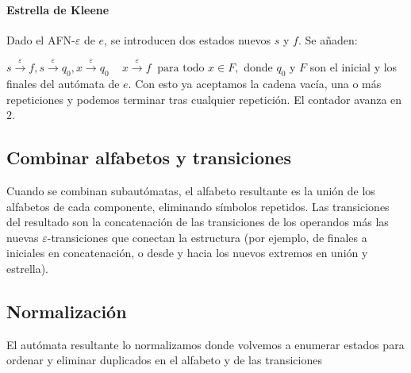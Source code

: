 \paragraph{Estrella de Kleene}
Dado el AFN-$\varepsilon$ de $e$, se introducen dos estados nuevos $s$ y $f$. Se añaden:

$
s \xrightarrow{\varepsilon} f,
s \xrightarrow{\varepsilon} q_0,
x \xrightarrow{\varepsilon} q_0\,\quad
x \xrightarrow{\varepsilon} f\ \text{ para todo } x \in F,
$
donde $q_0$ y $F$ son el inicial y los finales del autómata de $e$. Con esto ya aceptamos la cadena vacía, una o más repeticiones y podemos terminar tras cualquier repetición. El contador avanza en $2$.

\subsection{Combinar alfabetos y transiciones}

Cuando se combinan subautómatas, el alfabeto resultante es la unión de los alfabetos de cada componente, eliminando símbolos repetidos. Las transiciones del resultado son la concatenación de las transiciones de los operandos más las nuevas $\varepsilon$-transiciones que conectan la estructura (por ejemplo, de finales a iniciales en concatenación, o desde y hacia los nuevos extremos en unión y estrella).

\subsection{Normalización}

El autómata resultante lo normalizamos donde  volvemos a enumerar estados para ordenar y eliminar duplicados en el alfabeto y de las transiciones